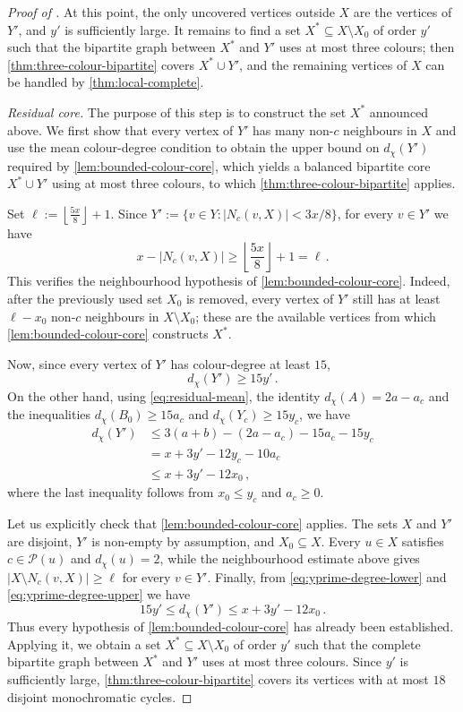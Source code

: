 \documentclass[a4paper,12pt,reqno]{amsart}
\newcommand{\cP}{\mathcal P}
\newcommand{\dd}{d_{\chi}}
\begin{document}
\begin{proof}[Proof of ]
At this point, the only uncovered vertices outside $X$ are the vertices of $Y'$, and
$y'$ is sufficiently large. It remains to find a set
$X^*\subseteq X\setminus X_0$ of order $y'$ such that the bipartite graph
between $X^*$ and $Y'$ uses at most three colours; then
\cref{thm:three-colour-bipartite} covers $X^*\cup Y'$, and the remaining
vertices of $X$ can be handled by \cref{thm:local-complete}.

\medskip
\noindent\emph{Residual core.} The purpose of this step is to construct the set
$X^*$ announced above. We first show that every vertex of $Y'$ has many non-$c$
neighbours in $X$ and use the mean colour-degree condition to obtain the upper
bound on $\dd(Y')$ required by \cref{lem:bounded-colour-core}, which yields a
balanced bipartite core $X^*\cup Y'$ using at most three colours, to which
\cref{thm:three-colour-bipartite} applies.

Set $\ell:=\left\lfloor\frac{5x}{8}\right\rfloor+1$. Since
$Y':=\{v\in Y\colon|N_c(v,X)|<3x / 8\}$, for every $v\in Y'$ we have
\[
  x-|N_c(v,X)|
  \ge \left\lfloor\frac{5x}{8}\right\rfloor+1=\ell\,.
\]
This verifies the neighbourhood hypothesis of \cref{lem:bounded-colour-core}.
Indeed, after the previously used set $X_0$ is removed, every vertex of $Y'$
still has at least $\ell-x_0$ non-$c$ neighbours in $X\setminus X_0$; these are
the available vertices from which \cref{lem:bounded-colour-core} constructs
$X^*$.

Now, since every vertex of $Y'$ has colour-degree at least $15$,
\begin{equation}\label{eq:yprime-degree-lower}
  \dd(Y')\ge15y'\,.
\end{equation}
On the other hand, using \eqref{eq:residual-mean},
the identity $\dd(A)=2a-a_c$ and the inequalities $\dd(B_0)\ge15a_c$ and
$\dd(Y_c)\ge15y_c$, we have
\begin{equation}\label{eq:yprime-degree-upper}
\begin{aligned}
  \dd(Y')
  &\le3(a+b)-(2a-a_c)-15a_c-15y_c\\
  &=x+3y'-12y_c-10a_c\\
  &\le x+3y'-12x_0\,,
\end{aligned}
\end{equation}
where the last inequality follows from $x_0\le y_c$ and $a_c\ge0$.

Let us explicitly check that \cref{lem:bounded-colour-core} applies. The sets
$X$ and $Y'$ are disjoint, $Y'$ is non-empty by assumption, and
$X_0\subseteq X$. Every $u\in X$ satisfies
$c\in\cP(u)$ and $\dd(u)=2$, while the neighbourhood estimate above gives
$|X\setminus N_c(v,X)|\ge\ell$ for every $v\in Y'$. Finally, from
\eqref{eq:yprime-degree-lower} and \eqref{eq:yprime-degree-upper} we have
\[
  15y'\le\dd(Y')\le x+3y'-12x_0\,.
\]
Thus every hypothesis of \cref{lem:bounded-colour-core} has already been
established. Applying it, we obtain a set $X^*\subseteq X\setminus X_0$ of order
$y'$ such that the complete bipartite graph between $X^*$ and $Y'$ uses at most
three colours. Since $y'$ is sufficiently large,
\cref{thm:three-colour-bipartite} covers its vertices with at most $18$
disjoint monochromatic cycles.


\end{proof}
\end{document}
